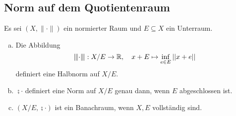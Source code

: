 \documentclass[FunkAnaskriptSS2017.tex]{subfiles}
\begin{document}
\subsection{Norm auf dem Quotientenraum}
\label{B4.1}
Es sei $(X, \|\cdot \|)$ ein normierter Raum und $E\subseteq X$ ein Unterraum.
\begin{beh}
	\begin{enumerate}[(a)]
	\item 	Die Abbildung
	$$ \interleave{\cdot}\interleave : X/E \to \mathbb{R},\quad x+E \mapsto \inf_{e\in E} \left\lvert \left\lvert x+e \right\rvert \right\rvert$$
	definiert eine Halbnorm auf $X/E$.
	
	\item 	$\semi{\cdot}$ definiert eine Norm auf $X/E$ genau dann, wenn $E$ abgeschlossen ist. 	
	
	\item $(X/E, \semi{\cdot})$ ist ein Banachraum, wenn $X, E$ vollständig sind.
	
	\end{enumerate}
\end{beh}
\end{document}
